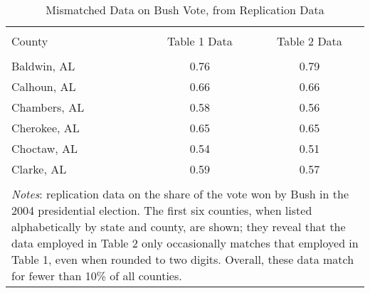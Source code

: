 
\begin{table}[!htbp] \centering 
  \caption{Mismatched Data on Bush Vote, from Replication Data} 
  \label{T:bush_al} 
\begin{tabular}{@{\extracolsep{5pt}} lcc} 
\\[-1.8ex]\hline 
\hline \\[-1.8ex] 
County & Table 1 Data & Table 2 Data \\ 
\hline \\[-1.8ex] 
Baldwin, AL & 0.76 & 0.79 \\ 
Calhoun, AL & 0.66 & 0.66 \\ 
Chambers, AL & 0.58 & 0.56 \\ 
Cherokee, AL & 0.65 & 0.65 \\ 
Choctaw, AL & 0.54 & 0.51 \\ 
Clarke, AL & 0.59 & 0.57 \\ 
\hline \\[-1.8ex] 
\multicolumn{3}{l}{\parbox[t]{10cm}{\emph{Notes}: \citet{Newman2015a} replication data on
		  the share of the vote won by Bush in the 2004 presidential election.  
		  The first six counties, when listed alphabetically by state and 
		  county, are shown; they reveal that the data employed in Table 2
		  only occasionally matches that employed in Table 1, even when
		  rounded to two digits.  Overall, these data match for fewer than
		  10\% of all counties.}} \\ 
\end{tabular} 
\end{table} 
